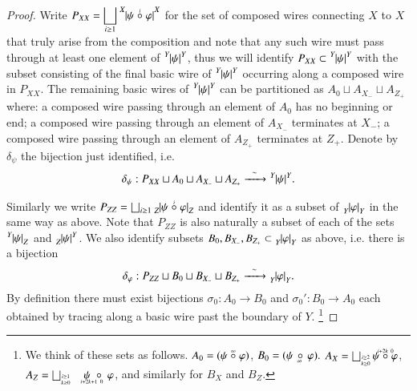 \documentclass{amsart}
\def\to{\rightarrow}
\newcommand{\Too}[1]{\xrightarrow{\ \ #1\ \ }}
\newcommand{\inp}[1]{{#1_-}}
\newcommand{\outp}[1]{{#1_+}}
\newcommand{\feeddd}[3]{{\tensor*[^{#2}_{\color{white}{!}}]{{|#1|}}{^{#3}}}}%
\newcommand{\feeddc}[3]{{\tensor*[^{#2}]{{|#1|}}{_{#3}}}}
\newcommand{\feedcd}[3]{{\tensor*[_{#2}]{{|#1|}}{^{#3}}}}
\newcommand{\feedcc}[3]{{\tensor*[^{\color{white}{!}}_{#2}]{{|#1|}}{_{#3}}}}
\theoremstyle{remark}
\theoremstyle{definition}
\begin{document}
\begin{proof}
Write $P_{XX}=\displaystyle\bigsqcup_{i\ge1}\feeddd{\psi\;\accentset{i}{\circ}\;\varphi}{X}{X}$ for the set of composed wires connecting $X$ to $X$ that truly arise from the composition and note that any such wire must pass through at least one element of $\feeddd{\psi}{Y}{Y}$, thus we will identify $P_{XX}\subset \feeddd{\psi}{Y}{Y}$ with the subset consisting of the final basic wire of $\feeddd{\psi}{Y}{Y}$ occurring along a composed wire in $P_{XX}$.  The remaining basic wires of $\feeddd{\psi}{Y}{Y}$ can be partitioned as $A_0\sqcup A_{\inp{X}}\sqcup A_{\outp{Z}}$ where: a composed wire passing through an element of $A_0$ has no beginning or end; a composed wire passing through an element of $A_{\inp{X}}$ terminates at $\inp{X}$; a composed wire passing through an element of $A_{\outp{Z}}$ terminates at $\outp{Z}$.  Denote by $\delta_\psi$ the bijection just identified, i.e.
\[\delta_\psi:P_{XX}\sqcup A_0\sqcup A_{\inp{X}}\sqcup A_{\outp{Z}}\Too{\sim}\feeddd{\psi}{Y}{Y}.\]

Similarly we write $P_{ZZ}=\bigsqcup_{i\ge1}\feedcc{\psi\;\accentset{i}{\circ}\;\varphi}{Z}{Z}$ and identify it as a subset of $\feedcc{\varphi}{Y}{Y}$ in the same way as above.  Note that $P_{ZZ}$ is also naturally a subset of each of the sets $\feeddc{\psi}{Y}{Z}$ and $\feedcd{\psi}{Z}{Y}$.  We also identify subsets $B_0,B_{\inp{X}},B_{\outp{Z}}\subset\feedcc{\varphi}{Y}{Y}$ as above, i.e. there is a bijection
\[\delta_\varphi:P_{ZZ}\sqcup B_0\sqcup B_{\inp{X}}\sqcup B_{\outp{Z}}\Too{\sim}\feedcc{\varphi}{Y}{Y}.\]
By definition there must exist bijections $\sigma_0:A_0\to B_0$ and $\sigma_0':B_0\to A_0$ each obtained by tracing along a basic wire past the boundary of $Y$.
 \footnote{We think of these sets as follows. $A_0=(\psi\;\accentset{\infty}{\circ}\;\varphi)$, $B_0=(\psi\,\underaccent{\;\ \infty}{\circ}\,\varphi).$ $A_X=\bigsqcup_{\substack{\scriptscriptstyle i\ge2\\ \scriptscriptstyle k\ge0}}\psi\;\accentset{i+2k\ 0}{\circ}\;\varphi$, $A_Z=\bigsqcup_{\substack{\scriptscriptstyle i\ge1\\ \scriptscriptstyle k\ge0}}\quad\psi\;\underaccent{i+2k+1\ 0\ \ \ }{\circ}\;\varphi$, and similarly for $B_X$ and $B_Z$.
}


\end{proof}
\end{document}
